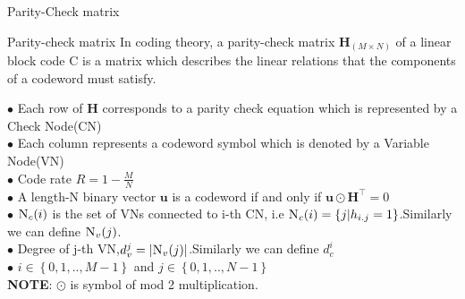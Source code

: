\documentclass{beamer}
\newcommand{\myvec}[1]{\ensuremath{\begin{pmatrix}#1\end{pmatrix}}}
\providecommand{\cbrak}[1]{\ensuremath{\left\{#1\right\}}}
\begin{document}
 \begin{frame}{Parity-Check matrix}
 \begin{block}{Parity-check matrix}
 In coding theory, a parity-check matrix $\textbf{H}_{(M\times N)}$ of a linear block code C is a matrix which describes the linear relations that the components of a codeword must satisfy.
 \end{block}
 $\bullet$ Each row of $\textbf{H}$ corresponds to a parity check equation which is represented by a Check Node(CN)\\
  $\bullet$ Each column represents a codeword symbol which is denoted by a Variable Node(VN)\\
  $\bullet$ Code rate $R=1-\frac{M}{N}$\\
  $\bullet$ A length-N binary vector $\textbf{u}$ is a codeword if and only if $\textbf{u}\odot\textbf{H}^{\top}=0$\\
  $\bullet$ $\textsc{N}_c(i)$ is the set of VNs connected to i-th CN, i.e $\textsc{N}_c(i)=\cbrak{j|h_{i.j}=1}$.Similarly we can define $\textsc{N}_v(j)$.\\
  $\bullet$ Degree of j-th VN,$d_v^j=|\textsc{N}_v(j)|$.Similarly we can define $d_c^i$\\
 $\bullet$ $i\in \cbrak{0,1,..,M-1}$ and $j\in \cbrak{0,1,..,N-1}$\\
\textbf{NOTE}: $\odot$ is symbol of mod 2 multiplication.
\end{frame}

 
\end{document}
